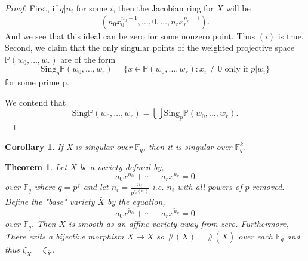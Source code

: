 \documentclass{article}
\newcommand{\F}{\mathbb{F}}
\newcommand{\Pro}{\mathbb{P}}
\newcommand{\Sing}[0]{\mathrm{Sing }}
\newtheorem{theorem}{Theorem}[section]
\newtheorem{corollary}{Corollary}[theorem]
\theoremstyle{definition}
\theoremstyle{definition}
\theoremstyle{remark}
\begin{document}
\begin{proof}
First, if $q|n_i$ for some $i$, then the Jacobian ring for $X$ will be \[(n_0x_0^{n_0-1}, \dots, 0, \dots, n_r x_r^{n_r-1}).\] And we see that this ideal can be zero for some nonzero point. Thus $(i)$ is true.\\

Second, we claim that the only singular points of the weighted projective space $\Pro(w_0, \dots, w_r)$ are of the form \[\Sing_p \Pro(w_0, \dots, w_r) = \{x \in \Pro(w_0, \dots, w_r) : x_i \ne 0 \text{ only if } p | w_i\}\] for some prime p.

We contend that \[\Sing \Pro(w_0, \dots, w_r)  = \bigcup \Sing_p \Pro(w_0, \dots, w_r).\]



\begin{comment}
The reason is that when we try to find the local affine coordinate ring of $X$, we first do the change of variable $$x_i^{(0)} = \frac{x_i}{x_0^{w_i/w_0}},$$ 
Then \[\F_p(x_0^{(0)}, x_1^{(0)}, \dots, x_r^{(0)})\] is a homogeneous ring of degree 0. The problem we introduce is that by adjoining $x_0^{1/w_0}$ we get an algebraic extension of $\F_p$, and the coordinate ring is will defined up to the action of $\zeta$, where $\zeta$ is the $a_0$-th root of unity. 
\end{comment}

\end{proof}
\begin{corollary}
If X is singular over $\F_q$, then it is singular over $\F_q^k$.
\end{corollary}


\begin{theorem} \label{thm:resolution_of_sigularities}
Let $X$ be a variety defined by,
\[ a_0 x^{n_0} + \cdots + a_r x^{n_r} = 0 \]
over $\F_q$ where $q = p^f$ and let $\tilde{n}_i = \frac{n_i}{p^{v_p(n_i)}}$ i.e. $n_i$ with all powers of $p$ removed. Define the "base" variety $\bar{X}$ by the equation,
\[ a_0 x^{\tilde{n}_0} + \cdots + a_r x^{\tilde{n}_r} = 0 \]
over $\F_q$. Then $\bar{X}$ is smooth as an affine variety away from zero. Furthermore, There exits a bijective morphism $X \to \bar{X}$ so $\#(X) = \#(\bar{X})$ over each $\F_q$ and thus $\zeta_X = \zeta_{\bar{X}}$. 
\end{theorem}
\end{document}
